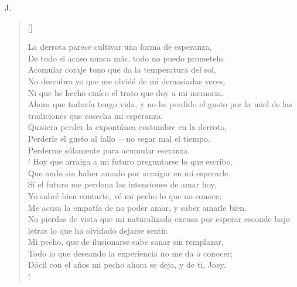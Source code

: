 \documentclass[11pt, a4paper]{article} %
\newcommand{\poemauthorright}[1]{\nopagebreak{\raggedleft\footnotesize\textsc{#1}\par}} %
\begin{document}
{ J}.


\poemtitle{}

\settowidth{\versewidth}{If you can meet with Triumph and Disaster} %

\begin{verse}[\versewidth]
{\scriptsize


La derrota parece cultivar una forma de esperanza, \\
De todo si acaso nunca más, todo no puedo prometelo. \\
Acomular coraje tono que da la temperatura del sol, \\
No descubra yo que me olvidé de mí demasiadas veces, \\
Ni que he hecho ciníco el trato que doy a mi memoria. \\
Ahora que todavía tengo vida, y no he perdido el gusto por la miel de las tradiciones que cosecha mi esperanza. \\
Quisiera perder la expontánea costumbre en la derrota, \\
Perderle el gusto al fallo ---no segar mal el tiempo. \\
Perderme sólamente para acumular eseranza. \\!
Hoy que arraiga a mi futuro preguntarse lo que escribo, \\
Que ando sin haber amado por arraigar en mí esperarle. \\
Si el futuro me perdona las intensiones de amar hoy, \\
Yo sabré bien contarte, vé mi pecho lo que no conoce; \\  
Me acusa la empatía de no poder amar, y saber amarle bien. \\
No pierdas de vista que mi naturalizada excusa por esperar esconde bajo letras lo que ha olvidado dejarse sentir. \\
Mi pecho, que de ilusionarse sabe sanar sin remplazar, \\
Todo lo que deseando la experiencia no me da a conocer; \\
Dócil con el años mi pecho ahora se deja, y de ti, Joey. \\!
}
\end{verse}


\poemauthorright{} %

\end{document}
